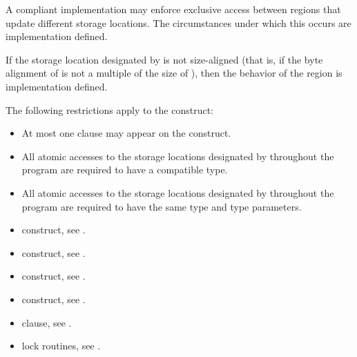 A compliant implementation may enforce exclusive access between  regions 
that update different storage locations. The circumstances under which this occurs are 
implementation defined. 

If the storage location designated by  is not size-aligned (that is, if the byte alignment 
of  is not a multiple of the size of ), then the behavior of the  region is 
implementation defined.

\begin{samepage}
\restrictions

The following restrictions apply to the  construct:

\begin{itemize}
\item At most one  clause may appear on the construct.
\end{itemize}

\ccppspecificstart
\begin{itemize}
\item All atomic accesses to the storage locations designated by  throughout the program 
are required to have a compatible type. 
\end{itemize}
\ccppspecificend
\end{samepage}

\fortranspecificstart
\begin{itemize}
\item All atomic accesses to the storage locations designated by  throughout the program 
are required to have the same type and type parameters. 
\end{itemize}
\fortranspecificend

\crossreferences
\begin{itemize}
\item {} construct, see 
. 

\item {} construct, see 
.

\item {} construct, see 
.

\item {} construct, see 
.

\item {} clause, see 
.

\item lock routines, see 
.
\end{itemize}










